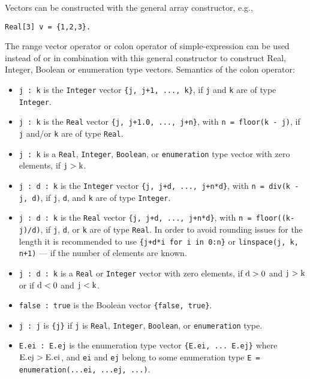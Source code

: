 Vectors can be constructed with the general array constructor, e.g.,
\begin{lstlisting}[language=modelica]
  Real[3] v = {1,2,3}.
\end{lstlisting}
The range vector operator or colon operator of simple-expression can be
used instead of or in combination with this general constructor to
construct Real, Integer, Boolean or enumeration type vectors. Semantics
of the colon operator:
\begin{itemize}
\item
  \lstinline!j : k! is the \lstinline!Integer! vector \lstinline!{j, j+1, ..., k}!, if \lstinline!j! and \lstinline!k! are of type
  \lstinline!Integer!.
\item
  \lstinline!j : k! is the \lstinline!Real! vector \lstinline!{j, j+1.0, ..., j+n}!, with \lstinline!n = floor(k - j)!, if
  \lstinline!j! and/or \lstinline!k! are of type \lstinline!Real!.
\item
  \lstinline!j : k! is a \lstinline!Real!, \lstinline!Integer!, \lstinline!Boolean!, or \lstinline!enumeration! type vector with
  zero elements, if $\text{\lstinline!j!} > \text{\lstinline!k!}$.
\item
  \lstinline!j : d : k! is the \lstinline!Integer! vector \lstinline!{j, j+d, ..., j+n*d}!, with \lstinline!n = div(k - j, d)!, if \lstinline!j!, \lstinline!d!, and \lstinline!k! are of type \lstinline!Integer!.
\item
  \lstinline!j : d : k! is the \lstinline!Real! vector \lstinline!{j, j+d, ..., j+n*d}!, with \lstinline!n = floor((k-j)/d)!, if \lstinline!j!, \lstinline!d!, or \lstinline!k! are of type \lstinline!Real!. In order to avoid rounding issues for the length it is recommended to use \lstinline!{j+d*i for i in 0:n}! or \lstinline!linspace(j, k, n+1)! --- if the number of elements are
  known.
\item
  \lstinline!j : d : k! is a \lstinline!Real! or \lstinline!Integer! vector with zero elements, if $\text{\lstinline!d!}
  > 0$ and $\text{\lstinline!j!} > \text{\lstinline!k!}$ or if $\text{\lstinline!d!} < 0$ and $\text{\lstinline!j!}
  < \text{\lstinline!k!}$.
\item
  \lstinline!false : true! is the Boolean vector \lstinline!{false, true}!.
\item
  \lstinline!j : j! is \lstinline!{j}! if \lstinline!j! is \lstinline!Real!, \lstinline!Integer!, \lstinline!Boolean!, or \lstinline!enumeration! type.
\item
  \lstinline!E.ei : E.ej! is the enumeration type vector \lstinline!{E.ei, ... E.ej}! where
  $\text{\lstinline!E.ej!} > \text{\lstinline!E.ei!}$, and \lstinline!ei! and \lstinline!ej! belong to some enumeration type
  \lstinline!E = enumeration(...ei, ...ej, ...)!.
\end{itemize}

